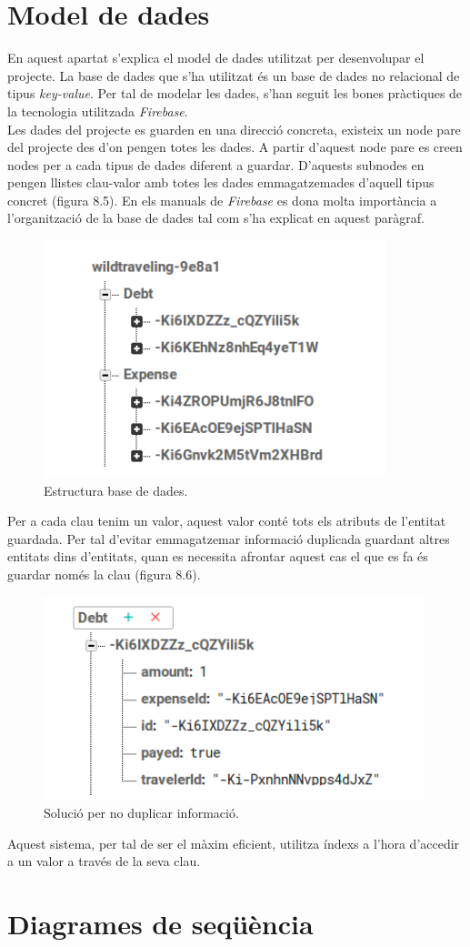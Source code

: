 \section{Model de dades}

En aquest apartat s'explica el model de dades utilitzat per desenvolupar el projecte. La base de dades que s'ha utilitzat és un base de dades no relacional de tipus \textit{key-value}. Per tal de modelar les dades, s'han seguit les bones pràctiques de la tecnologia utilitzada \textit{Firebase}.\\

Les dades del projecte es guarden en una direcció concreta, existeix un node pare del projecte des d'on pengen totes les dades. A partir d'aquest node pare es creen nodes per a cada tipus de dades diferent a guardar. D'aquests subnodes en pengen llistes clau-valor amb totes les dades emmagatzemades d'aquell tipus concret (figura 8.5). En els manuals de \textit{Firebase} es dona molta importància a l'organització de la base de dades tal com s'ha explicat en aquest paràgraf.\\

\begin{figure}[!h]
\centering
\includegraphics[scale=1.00]{Figures/EstructuraBD.jpg}
\caption{Estructura base de dades.}
\end{figure}


Per a cada clau tenim un valor, aquest valor conté tots els atributs de l'entitat guardada. Per tal d'evitar emmagatzemar informació duplicada guardant altres entitats dins d'entitats, quan es necessita afrontar aquest cas el que es fa és guardar només la clau (figura 8.6).\\


\begin{figure}[!h]
\centering
\includegraphics[scale=1.00]{Figures/DebtBD.jpg}
\caption{Solució per no duplicar informació.}
\end{figure}

Aquest sistema, per tal de ser el màxim eficient, utilitza índexs a l'hora d'accedir a un valor a través de la seva clau.

\section{Diagrames de seqüència}
